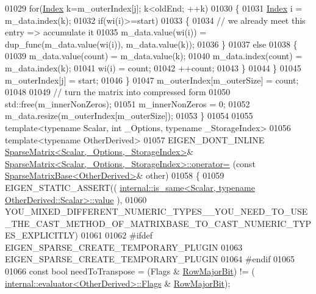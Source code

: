 \begin{DoxyCode}
01029     \textcolor{keywordflow}{for}(\hyperlink{group___core___module_a554f30542cc2316add4b1ea0a492ff02}{Index} k=m\_outerIndex[j]; k<oldEnd; ++k)
01030     \{
01031       \hyperlink{group___core___module_a554f30542cc2316add4b1ea0a492ff02}{Index} i = m\_data.index(k);
01032       \textcolor{keywordflow}{if}(wi(i)>=start)
01033       \{
01034         \textcolor{comment}{// we already meet this entry => accumulate it}
01035         m\_data.value(wi(i)) = dup\_func(m\_data.value(wi(i)), m\_data.value(k));
01036       \}
01037       \textcolor{keywordflow}{else}
01038       \{
01039         m\_data.value(count) = m\_data.value(k);
01040         m\_data.index(count) = m\_data.index(k);
01041         wi(i) = count;
01042         ++count;
01043       \}
01044     \}
01045     m\_outerIndex[j] = start;
01046   \}
01047   m\_outerIndex[m\_outerSize] = count;
01048 
01049   \textcolor{comment}{// turn the matrix into compressed form}
01050   std::free(m\_innerNonZeros);
01051   m\_innerNonZeros = 0;
01052   m\_data.resize(m\_outerIndex[m\_outerSize]);
01053 \}
01054 
01055 \textcolor{keyword}{template}<\textcolor{keyword}{typename} Scalar, \textcolor{keywordtype}{int} \_Options, \textcolor{keyword}{typename} \_StorageIndex>
01056 \textcolor{keyword}{template}<\textcolor{keyword}{typename} OtherDerived>
01057 EIGEN\_DONT\_INLINE \hyperlink{group___sparse_core___module_class_eigen_1_1_sparse_matrix}{SparseMatrix<Scalar,\_Options,\_StorageIndex>}& 
      \hyperlink{group___sparse_core___module_class_eigen_1_1_sparse_matrix}{SparseMatrix<Scalar,\_Options,\_StorageIndex>::operator=}
      (\textcolor{keyword}{const} \hyperlink{group___sparse_core___module_class_eigen_1_1_sparse_matrix_base}{SparseMatrixBase<OtherDerived>}& other)
01058 \{
01059   EIGEN\_STATIC\_ASSERT((
      \hyperlink{struct_eigen_1_1internal_1_1is__same}{internal::is\_same<Scalar, typename OtherDerived::Scalar>::value}
      ),
01060         
      YOU\_MIXED\_DIFFERENT\_NUMERIC\_TYPES\_\_YOU\_NEED\_TO\_USE\_THE\_CAST\_METHOD\_OF\_MATRIXBASE\_TO\_CAST\_NUMERIC\_TYPES\_EXPLICITLY)
01061 
01062   \textcolor{preprocessor}{#ifdef EIGEN\_SPARSE\_CREATE\_TEMPORARY\_PLUGIN}
01063     EIGEN\_SPARSE\_CREATE\_TEMPORARY\_PLUGIN
01064 \textcolor{preprocessor}{  #endif}
01065       
01066   \textcolor{keyword}{const} \textcolor{keywordtype}{bool} needToTranspose = (Flags & \hyperlink{group__flags_gae4f56c2a60bbe4bd2e44c5b19cbe8762}{RowMajorBit}) != (
      \hyperlink{struct_eigen_1_1internal_1_1evaluator}{internal::evaluator<OtherDerived>::Flags} & 
      \hyperlink{group__flags_gae4f56c2a60bbe4bd2e44c5b19cbe8762}{RowMajorBit});

\end{DoxyCode}
